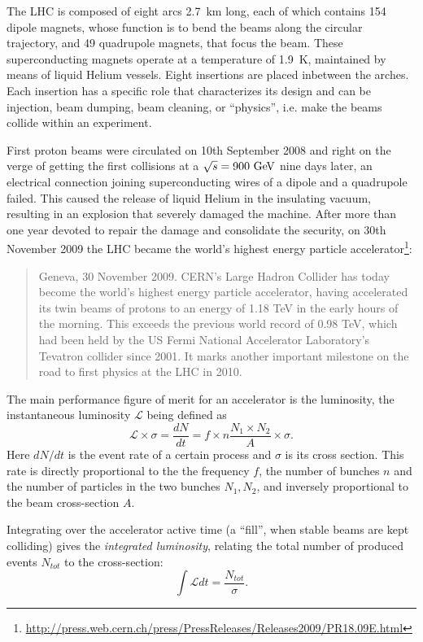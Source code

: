 The LHC is composed of eight arcs 2.7~km long, each of which contains 154 dipole 
magnets, whose function is to  bend the beams along the circular trajectory, and
49 quadrupole magnets, that focus the beam. These superconducting magnets operate
at a temperature of 1.9~K, maintained by means of liquid Helium vessels.
Eight insertions are placed inbetween the arches. Each insertion has a specific
role that characterizes its design and can be injection, beam dumping, beam cleaning,
or ``physics'', i.e. make the beams collide within an experiment.

First proton beams were circulated on 10th September 2008 and right on the verge of
getting the first collisions at a \cme $\rts=900\gev$ nine days later, an electrical
connection joining superconducting wires of a dipole and a quadrupole
failed. This caused the release of liquid Helium in the insulating vacuum,
resulting in an explosion that severely damaged the machine.
After more than one year devoted to repair the damage and consolidate the security,
on 30th November 2009 the LHC became the world's highest energy particle 
accelerator\footnote{\url{http://press.web.cern.ch/press/PressReleases/Releases2009/PR18.09E.html}}:
\begin{quotation}\small
Geneva, 30 November 2009. CERN's Large Hadron Collider has today become the world’s highest energy particle accelerator, having accelerated its twin beams of protons to an energy of 1.18 TeV in the early hours of the morning. This exceeds the previous world record of 0.98 TeV, which had been held by the US Fermi National Accelerator Laboratory’s Tevatron collider since 2001. It marks another important milestone on the road to first physics at the LHC in 2010.
\end{quotation}



The main performance figure of merit for an accelerator is the luminosity, the 
instantaneous luminosity $\mathcal L$ being defined as 
\begin{equation}\label{eq:lumiN}
\mathcal{L}\times\sigma=\dfrac{dN}{dt}=f\times n\dfrac{N_1\times N_2}{A}\times\sigma.
\end{equation} 
Here $dN/dt $ is the event rate of a certain process and $\sigma$ is its cross 
section. This rate is directly proportional to the the frequency $f$, the number 
of bunches $n$ and the number of particles in the two bunches $N_1, N_2$, and
inversely proportional to the beam cross-section $A$.

Integrating over the accelerator active time (a ``fill'', when stable beams are kept
colliding) gives the \textit{integrated luminosity}, relating the total number 
of produced events $N_{tot}$ to the cross-section:
\begin{equation}\label{eq:intLumi}
\int \mathcal L dt  = \dfrac{N_{tot}}{\sigma}.
\end{equation}




